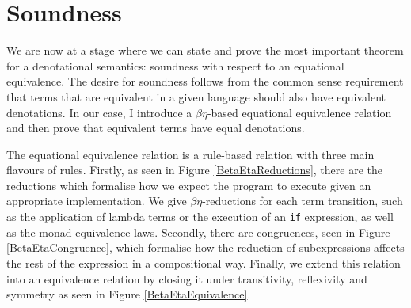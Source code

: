 \documentclass{Report}
\begin{document}
\section{Soundness}
\label{SoundnessDefinition}
We are now at a stage where we can state and prove the most important theorem for a denotational semantics: soundness with respect to an equational equivalence. The desire for soundness follows from the common sense requirement that terms that are equivalent in a given language should also have equivalent denotations. In our case, I introduce a $\beta\eta$-based equational equivalence relation and then prove that equivalent terms have equal denotations.

The equational equivalence relation is a rule-based relation with three main flavours of rules. Firstly, as seen in Figure \ref{BetaEtaReductions}, there are the reductions which formalise how we expect the program to execute given an appropriate implementation. We give $\beta\eta$-reductions for each term transition, such as the application of lambda terms or the execution of an \texttt{if} expression, as well as the monad equivalence laws. Secondly, there are congruences, seen in Figure \ref{BetaEtaCongruence}, which formalise how the reduction of subexpressions affects the rest of the expression in a compositional way. Finally, we extend this relation into an equivalence relation by closing it under transitivity, reflexivity and symmetry as seen in Figure \ref{BetaEtaEquivalence}.
\end{document}
